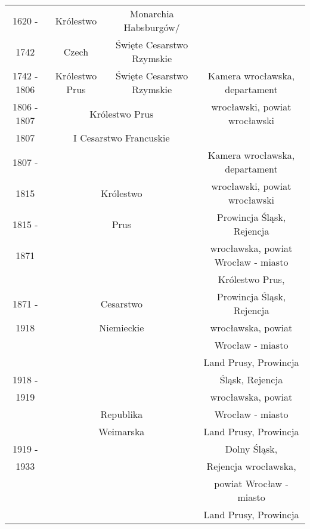 \documentclass[12pt]{article}
\begin{document}
\begin{center}
\begin{longtable}{|c|c|c|c|}
\hline
\cellcolor{cyan}1620 - & Królestwo & Monarchia Habsburgów/ & \\
\cellcolor{cyan}1742 & Czech & Święte Cesarstwo Rzymskie & \\
\hline
\cellcolor{pink}1742 - 1806 & Królestwo Prus & Święte Cesarstwo Rzymskie & Kamera wrocławska, departament \\
\cline{1-2}\cline{2-3}
\cellcolor{pink}1806 - 1807 & \multicolumn{2}{c|}{Królestwo Prus} & wrocławski, powiat wrocławski \\
\hline
\cellcolor{blue}1807 & \multicolumn{2}{c|}{I Cesarstwo Francuskie} & \\
\hline
\cellcolor{pink}1807 - & \multicolumn{2}{c|}{} & Kamera wrocławska, departament \\
\cellcolor{pink}1815 & \multicolumn{2}{c|}{Królestwo} & wrocławski, powiat wrocławski \\
\cline{1-1}\cline{4-4}
\cellcolor{pink}1815 - & \multicolumn{2}{c|}{Prus} & Prowincja Śląsk, Rejencja \\
\cellcolor{pink}1871 & \multicolumn{2}{c|}{} & wrocławska, powiat Wrocław - miasto \\
\hline
\cellcolor{magenta} & \multicolumn{2}{c|}{} & Królestwo Prus, \\
\cellcolor{magenta}1871 - & \multicolumn{2}{c|}{Cesarstwo} & Prowincja Śląsk, Rejencja \\
\cellcolor{magenta}1918 & \multicolumn{2}{c|}{Niemieckie} & wrocławska, powiat \\
\cellcolor{magenta} & \multicolumn{2}{c|}{} & Wrocław - miasto \\
\hline
\cellcolor{magenta} & \multicolumn{2}{c|}{} & Land Prusy, Prowincja \\
\cellcolor{magenta}1918 - & \multicolumn{2}{c|}{} & Śląsk, Rejencja \\
\cellcolor{magenta}1919 & \multicolumn{2}{c|}{} & wrocławska, powiat \\
\cellcolor{magenta} & \multicolumn{2}{c|}{Republika} & Wrocław - miasto \\
\cline{1-1}\cline{4-4}
\cellcolor{magenta} & \multicolumn{2}{c|}{Weimarska} & Land Prusy, Prowincja \\
\cellcolor{magenta}1919 - & \multicolumn{2}{c|}{} & Dolny Śląsk, \\
\cellcolor{magenta}1933 & \multicolumn{2}{c|}{} & Rejencja wrocławska, \\
\cellcolor{magenta} & \multicolumn{2}{c|}{} & powiat Wrocław - miasto \\
\hline
\cellcolor{magenta} & \multicolumn{2}{c|}{} & Land Prusy, Prowincja \\

\end{longtable}
\end{center}
\end{document}
